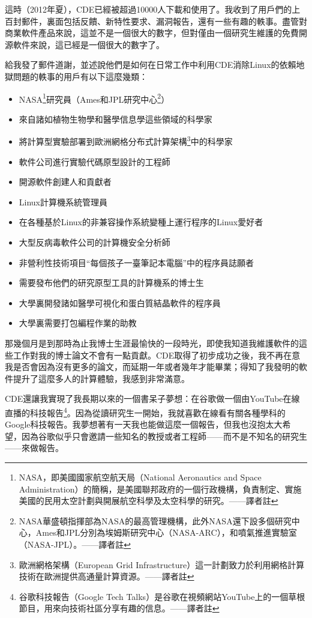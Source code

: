 \documentclass[12pt,UTF8,nofonts]{book}
\begin{document}
這時（2012年夏），CDE已經被超過10000人下載和使用了。我收到了用戶們的上百封郵件，裏面包括反饋、新特性要求、漏洞報告，還有一些有趣的軼事。盡管對商業軟件產品來說，這並不是一個很大的數字，但對僅由一個研究生維護的免費開源軟件來說，這已經是一個很大的數字了。

給我發了郵件道謝，並述說他們是如何在日常工作中利用CDE消除Linux的依賴地獄問題的軼事的用戶有以下這麼幾類：
\begin{itemize}
  \item NASA\footnote{NASA，即美國國家航空航天局（National Aeronautics and Space Administration）的簡稱，是美國聯邦政府的一個行政機構，負責制定、實施美國的民用太空計劃與開展航空科學及太空科學的研究。——譯者註}研究員（Ames和JPL研究中心\footnote{NASA華盛頓指揮部為NASA的最高管理機構，此外NASA還下設多個研究中心，Ames和JPL分別為埃姆斯研究中心（NASA-ARC），和噴氣推進實驗室（NASA-JPL）。——譯者註}）
  \item 來自諸如植物生物學和醫學信息學這些領域的科學家
  \item 將計算型實驗部署到歐洲網格分布式計算架構\footnote{歐洲網格架構（European Grid Infrastructure）這一計劃致力於利用網格計算技術在歐洲提供高通量計算資源。——譯者註}中的科學家
  \item 軟件公司進行實驗代碼原型設計的工程師
  \item 開源軟件創建人和貢獻者
  \item Linux計算機系統管理員
  \item 在各種基於Linux的非兼容操作系統變種上運行程序的Linux愛好者
  \item 大型反病毒軟件公司的計算機安全分析師
  \item 非營利性技術項目“每個孩子一臺筆記本電腦”中的程序員誌願者
  \item 需要發布他們的研究原型工具的計算機系的博士生
  \item 大學裏開發諸如醫學可視化和蛋白質結晶軟件的程序員
  \item 大學裏需要打包編程作業的助教
\end{itemize}
那幾個月是到那時為止我博士生涯最愉快的一段時光，即使我知道我維護軟件的這些工作對我的博士論文不會有一點貢獻。CDE取得了初步成功之後，我不再在意我是否會因為沒有更多的論文，而延期一年或者幾年才能畢業；得知了我發明的軟件提升了這麼多人的計算體驗，我感到非常滿意。

\breakline

CDE還讓我實現了我長期以來的一個書呆子夢想：在谷歌做一個由YouTube在線直播的科技報告\footnote{谷歌科技報告（Google Tech Talks）是谷歌在視頻網站YouTube上的一個草根節目，用來向技術社區分享有趣的信息。——譯者註}。因為從讀研究生一開始，我就喜歡在線看有關各種學科的Google科技報告。我夢想著有一天我也能做這麼一個報告，但我也沒抱太大希望，因為谷歌似乎只會邀請一些知名的教授或者工程師——而不是不知名的研究生——來做報告。
\end{document}
